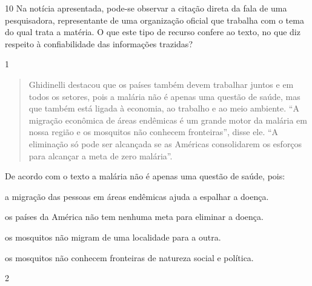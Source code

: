 \num{10} Na notícia apresentada, pode-se observar a citação direta da fala de
uma pesquisadora, representante de uma organização oficial que trabalha
com o tema do qual trata a matéria. O que este tipo de recurso confere
ao texto, no que diz respeito à confiabilidade das informações trazidas?



\num{1}

\begin{quote}
Ghidinelli destacou que os países também devem trabalhar juntos e em
todos os setores, pois a malária não é apenas uma questão de saúde, mas
que também está ligada à economia, ao trabalho e ao meio ambiente. ``A
migração econômica de áreas endêmicas é um grande motor da malária em
nossa região e os mosquitos não conhecem fronteiras'', disse ele. ``A
eliminação só pode ser alcançada se as Américas consolidarem os esforços
para alcançar a meta de zero malária''.
\end{quote}


De acordo com o texto a malária não é apenas uma questão de saúde, pois:

\begin{escolha}

  \item a migração das pessoas em áreas endêmicas ajuda a espalhar a doença.

  \item os países da América não tem nenhuma meta para eliminar a doença.

  \item os mosquitos não migram de uma localidade para a outra. 

  \item os mosquitos não conhecem fronteiras de natureza social e política.

\end{escolha}

\num{2}

